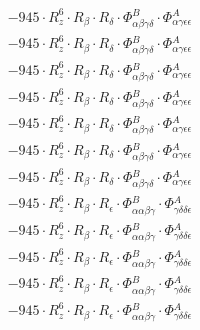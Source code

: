 \documentclass{article}
\begin{document}
\begin{subequations}
\begin{gather}
\begin{array}{c}
 \\[0.2em] 		 - 945 \cdot R_{z}^{6} \cdot R_{\beta{}} \cdot R_{\delta{}} \cdot \Phi{}^{B}_{\alpha{}\beta{}\gamma{}\delta{}} \cdot \Phi{}^{A}_{\alpha{}\gamma{}\epsilon{}\epsilon{}} 
 \\[0.2em] 		 - 945 \cdot R_{z}^{6} \cdot R_{\beta{}} \cdot R_{\delta{}} \cdot \Phi{}^{B}_{\alpha{}\beta{}\gamma{}\delta{}} \cdot \Phi{}^{A}_{\alpha{}\gamma{}\epsilon{}\epsilon{}} 
 \\[0.2em] 		 - 945 \cdot R_{z}^{6} \cdot R_{\beta{}} \cdot R_{\delta{}} \cdot \Phi{}^{B}_{\alpha{}\beta{}\gamma{}\delta{}} \cdot \Phi{}^{A}_{\alpha{}\gamma{}\epsilon{}\epsilon{}} 
 \\[0.2em] 		 - 945 \cdot R_{z}^{6} \cdot R_{\beta{}} \cdot R_{\delta{}} \cdot \Phi{}^{B}_{\alpha{}\beta{}\gamma{}\delta{}} \cdot \Phi{}^{A}_{\alpha{}\gamma{}\epsilon{}\epsilon{}} 
 \\[0.2em] 		 - 945 \cdot R_{z}^{6} \cdot R_{\beta{}} \cdot R_{\delta{}} \cdot \Phi{}^{B}_{\alpha{}\beta{}\gamma{}\delta{}} \cdot \Phi{}^{A}_{\alpha{}\gamma{}\epsilon{}\epsilon{}} 
 \\[0.2em] 		 - 945 \cdot R_{z}^{6} \cdot R_{\beta{}} \cdot R_{\delta{}} \cdot \Phi{}^{B}_{\alpha{}\beta{}\gamma{}\delta{}} \cdot \Phi{}^{A}_{\alpha{}\gamma{}\epsilon{}\epsilon{}} 
 \\[0.2em] 		 - 945 \cdot R_{z}^{6} \cdot R_{\beta{}} \cdot R_{\delta{}} \cdot \Phi{}^{B}_{\alpha{}\beta{}\gamma{}\delta{}} \cdot \Phi{}^{A}_{\alpha{}\gamma{}\epsilon{}\epsilon{}} 
 \\[0.2em] 		 - 945 \cdot R_{z}^{6} \cdot R_{\beta{}} \cdot R_{\epsilon{}} \cdot \Phi{}^{B}_{\alpha{}\alpha{}\beta{}\gamma{}} \cdot \Phi{}^{A}_{\gamma{}\delta{}\delta{}\epsilon{}} 
 \\[0.2em] 		 - 945 \cdot R_{z}^{6} \cdot R_{\beta{}} \cdot R_{\epsilon{}} \cdot \Phi{}^{B}_{\alpha{}\alpha{}\beta{}\gamma{}} \cdot \Phi{}^{A}_{\gamma{}\delta{}\delta{}\epsilon{}} 
 \\[0.2em] 		 - 945 \cdot R_{z}^{6} \cdot R_{\beta{}} \cdot R_{\epsilon{}} \cdot \Phi{}^{B}_{\alpha{}\alpha{}\beta{}\gamma{}} \cdot \Phi{}^{A}_{\gamma{}\delta{}\delta{}\epsilon{}} 
 \\[0.2em] 		 - 945 \cdot R_{z}^{6} \cdot R_{\beta{}} \cdot R_{\epsilon{}} \cdot \Phi{}^{B}_{\alpha{}\alpha{}\beta{}\gamma{}} \cdot \Phi{}^{A}_{\gamma{}\delta{}\delta{}\epsilon{}} 
 \\[0.2em] 		 - 945 \cdot R_{z}^{6} \cdot R_{\beta{}} \cdot R_{\epsilon{}} \cdot \Phi{}^{B}_{\alpha{}\alpha{}\beta{}\gamma{}} \cdot \Phi{}^{A}_{\gamma{}\delta{}\delta{}\epsilon{}} 

\end{array}
\end{gather}
\end{subequations}
\end{document}
